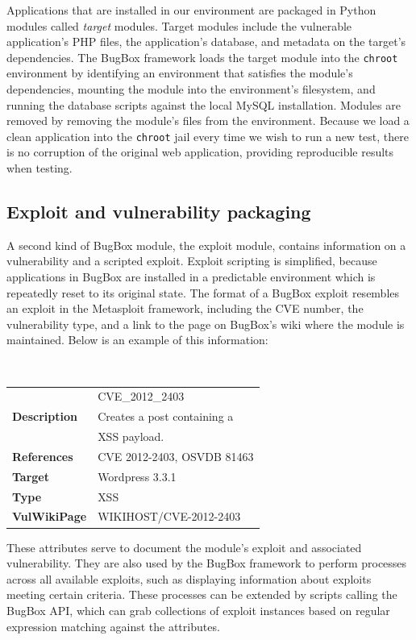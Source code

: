 \documentclass[letterpaper,twocolumn,10pt]{article}
\begin{document}
Applications that are installed in our environment are packaged in Python modules called \textit{target} modules. Target modules include the vulnerable application's PHP files, the application's database, and metadata on the target's dependencies. The BugBox framework loads the target module into the \texttt{chroot} environment by identifying an environment that satisfies the module's dependencies, mounting the module into the environment's filesystem, and running the database scripts against the local MySQL installation. Modules are removed by removing the module's files from the environment. Because we load a clean application into the {\tt chroot} jail every time we wish to run a new test, there is no corruption of the original web application, providing reproducible results when testing.

\subsection{Exploit and vulnerability packaging}

A second kind of BugBox module, the exploit module, contains information on a vulnerability and a scripted exploit. Exploit scripting is simplified, because applications in BugBox are installed in a predictable environment which is repeatedly reset to its original state. The format of a BugBox exploit resembles an exploit in the Metasploit framework, including the CVE number, the vulnerability type, and a link to the page on BugBox's wiki where the module is maintained. Below is an example of this information:

\begin{minipage}{\textwidth}
{\tt \small
\begin{tabular} { l l }
\noindent{\bf Name}&CVE\_2012\_2403\\
{\bf Description}&Creates a post containing a\\& XSS payload.\\
{\bf References}&CVE 2012-2403, OSVDB 81463 \\
{\bf Target}&Wordpress 3.3.1\\
{\bf Type}&XSS\\
{\bf VulWikiPage}&WIKIHOST/CVE-2012-2403
\end{tabular}
}
\end{minipage}

These attributes serve to document the module's exploit and associated vulnerability. They are also used by the BugBox framework to perform processes across all available exploits, such as displaying information about exploits meeting certain criteria. These processes can be extended by scripts calling the BugBox API, which can grab collections of exploit instances based on regular expression matching against the attributes.
\end{document}
